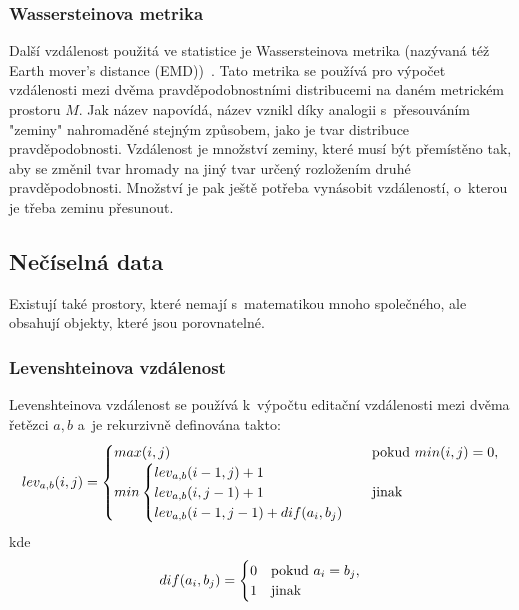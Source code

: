 \subsubsection{Wassersteinova metrika}
Další vzdálenost použitá ve statistice je Wassersteinova metrika (nazývaná též Earth mover's distance (EMD))~\cite{Vallender73}. Tato metrika se používá pro výpočet vzdá\-le\-nos\-ti mezi dvěma pravděpodobnostními distribucemi na daném metrickém prostoru $M$. Jak název napovídá, název vznikl díky analogii s~přesouváním "zeminy" nahromaděné stejným způsobem, jako je tvar distribuce pravděpodobnosti. Vzdálenost je množství zeminy, které musí být přemístěno tak, aby se změnil tvar hromady na jiný tvar určený rozložením druhé pravděpodobnosti. Množství je pak ještě potřeba vynásobit vzdáleností, o~kterou je třeba zeminu přesunout.%

\subsection{Nečíselná data}
Existují také prostory, které nemají s~matematikou mnoho společného, ale obsahují objekty, které jsou porovnatelné.

\subsubsection{Levenshteinova vzdálenost} Levenshteinova vzdálenost se používá k~výpočtu editační vzdálenosti mezi dvěma řetězci $ a, b $ a~je rekurzivně definována takto:
\begin{equation}\label{eq:levenshtein}
lev_{a,b}(i,j)=
\begin{cases}
max(i,j) & $pokud $ min(i,j)=0, \cr
min \begin{cases}
lev_{a,b}(i-1,j) + 1 \cr
lev_{a,b}(i,j-1) + 1 \cr
lev_{a,b}(i-1,j-1) + dif(a_i,b_j)
\end{cases} & $jinak$
\end{cases}
\end{equation}
kde \begin{equation*}
dif(a_i,b_j)=
\begin{cases}
0 & $pokud $ a_i = b_j, \cr
1 & $jinak$
\end{cases}
\end{equation*}

